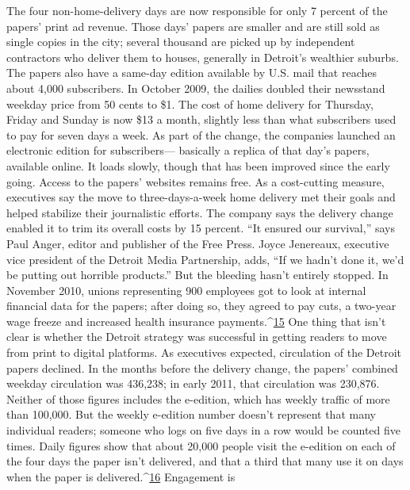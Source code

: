 The four non-home-delivery days are now responsible for only 7 percent of
the papers’ print ad revenue. Those days’ papers are smaller and are still sold as
single copies in the city; several thousand are picked up by independent contractors
who deliver them to houses, generally in Detroit’s wealthier suburbs. The
papers also have a same-day edition available by U.S. mail that reaches about
4,000 subscribers.
In October 2009, the dailies doubled their newsstand weekday price from 50
cents to \$1. The cost of home delivery for Thursday, Friday and Sunday is now
\$13 a month, slightly less than what subscribers used to pay for seven days a week.
As part of the change, the companies launched an electronic edition for subscribers—
basically a replica of that day’s papers, available online. It loads slowly,
though that has been improved since the early going. Access to the papers’ websites
remains free.
As a cost-cutting measure, executives say the move to three-days-a-week home
delivery met their goals and helped stabilize their journalistic efforts. The company
says the delivery change enabled it to trim its overall costs by 15 percent.
``It ensured our survival,'' says Paul Anger, editor and publisher of the Free Press.
Joyce Jenereaux, executive vice president of the Detroit Media Partnership, adds,
``If we hadn’t done it, we’d be putting out horrible products.'' But the bleeding
hasn’t entirely stopped. In November 2010, unions representing 900 employees
got to look at internal financial data for the papers; after doing so, they agreed
to pay cuts, a two-year wage freeze and increased health insurance payments.^{\href{#endnotes-ch7}{15}}
One thing that isn’t clear is whether the Detroit strategy was successful in
getting readers to move from print to digital platforms. As executives expected,
circulation of the Detroit papers declined. In the months before the delivery
change, the papers’ combined weekday circulation was 436,238; in early 2011,
that circulation was 230,876. Neither of those figures includes the e-edition,
which has weekly traffic of more than 100,000. But the weekly e-edition number
doesn’t represent that many individual readers; someone who logs on five
days in a row would be counted five times. Daily figures show that about 20,000
people visit the e-edition on each of the four days the paper isn’t delivered, and
that a third that many use it on days when the paper is delivered.^{\href{#endnotes-ch7}{16}} Engagement is
